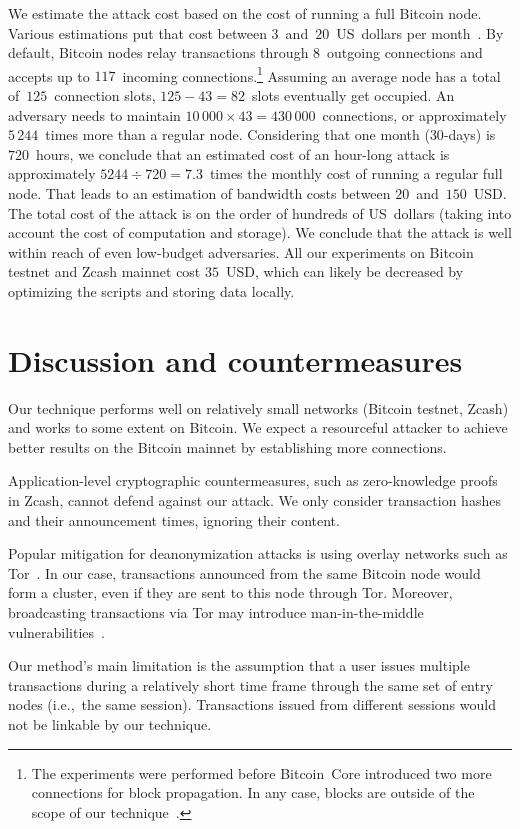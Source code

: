 We estimate the attack cost based on the cost of running a full Bitcoin node.
Various estimations put that cost between $3$~and~$20$~US~dollars per month~\cite{Zeyde2018, Connell2017}.
By default, Bitcoin nodes relay transactions through $8$~outgoing connections and accepts up to $117$~incoming connections.\footnote{The experiments were performed before Bitcoin~Core introduced two more connections for block propagation. In any case, blocks are outside of the scope of our technique~\cite{Daftuar2019}.}
Assuming an average node has a total of~$125$~connection slots, $125 - 43 = 82$~slots eventually get occupied.
An adversary needs to maintain $10\,000 \times 43 = 430\,000$~connections, or approximately $5\,244$~times more than a regular node.
Considering that one month ($30$-days) is $720$~hours, we conclude that an estimated cost of an hour-long attack is approximately $5244 \div 720 = 7.3$~times the monthly cost of running a regular full node.
That leads to an estimation of bandwidth costs between $20$~and~$150$~USD\@.
The total cost of the attack is on the order of hundreds of US~dollars (taking into account the cost of computation and storage).
We conclude that the attack is well within reach of even low-budget adversaries.
All our experiments on Bitcoin testnet and Zcash mainnet cost $35$~USD, which can likely be decreased by optimizing the scripts and storing data locally.


\section{Discussion and countermeasures}

Our technique performs well on relatively small networks (Bitcoin testnet, Zcash) and works to some extent on Bitcoin.
We expect a resourceful attacker to achieve better results on the Bitcoin mainnet by establishing more connections.

Application-level cryptographic countermeasures, such as zero-knowledge proofs in Zcash, cannot defend against our attack.
We only consider transaction hashes and their announcement times, ignoring their content.

Popular mitigation for deanonymization attacks is using overlay networks such as Tor~\cite{Tor}.
In our case, transactions announced from the same Bitcoin node would form a cluster, even if they are sent to this node through Tor.
Moreover, broadcasting transactions via Tor may introduce man-in-the-middle vulnerabilities~\cite{Biryukov2015}.

Our method's main limitation is the assumption that a user issues multiple transactions during a relatively short time frame through the same set of entry nodes (i.e.,~the same session).
Transactions issued from different sessions would not be linkable by our technique.

